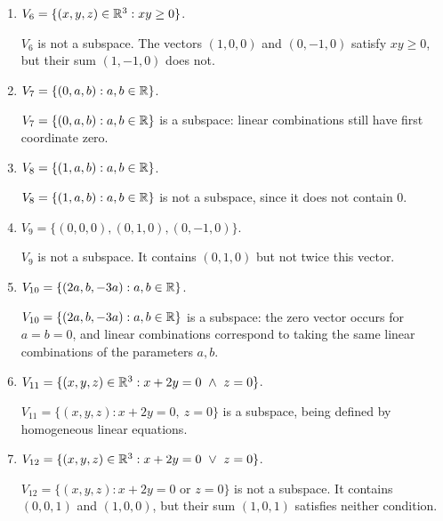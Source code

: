 \begin{enumerate}[label=\alph*)]
\item $V_6=\{(x,y,z)\in\mathbb R^3:xy\ge0\}$.

\begin{answer}
$V_6$ is not a subspace. The vectors $(1,0,0)$ and $(0,-1,0)$ satisfy
$xy\ge0$, but their sum $(1,-1,0)$ does not.
\end{answer}

\item $V_7=\{(0,a,b):a,b\in\mathbb R\}$.

\begin{answer}
$V_7=\{(0,a,b):a,b\in\mathbb R\}$ is a subspace: linear combinations still
have first coordinate zero.
\end{answer}

\item $V_8=\{(1,a,b):a,b\in\mathbb R\}$.

\begin{answer}
$V_8=\{(1,a,b):a,b\in\mathbb R\}$ is not a subspace, since it does not contain $0$.
\end{answer}

\item $V_9=\{(0,0,0),(0,1,0),(0,-1,0)\}$.

\begin{answer}
$V_9$ is not a subspace. It contains $(0,1,0)$ but not twice this vector.
\end{answer}

\item $V_{10}=\{(2a,b,-3a):a,b\in\mathbb R\}$.

\begin{answer}
$V_{10}=\{(2a,b,-3a):a,b\in\mathbb R\}$ is a subspace: the zero vector occurs
for $a=b=0$, and linear combinations correspond to taking the same linear
combinations of the parameters $a,b$.
\end{answer}

\item $V_{11}=\{(x,y,z)\in\RR^3:x+2y=0\ \land\ z=0\}$.

\begin{answer}
$V_{11}=\{(x,y,z):x+2y=0,\ z=0\}$ is a subspace, being defined by
homogeneous linear equations.
\end{answer}

\item $V_{12}=\{(x,y,z)\in\RR^3:x+2y=0\ \lor\ z=0\}$.

\begin{answer}
$V_{12}=\{(x,y,z):x+2y=0\text{ or }z=0\}$ is not a subspace.
It contains $(0,0,1)$ and $(1,0,0)$, but their sum $(1,0,1)$ satisfies neither condition.
\end{answer}
\end{enumerate}
